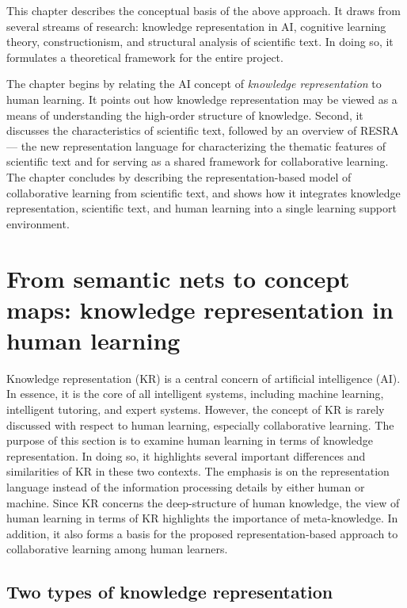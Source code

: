 This chapter describes the conceptual basis of the above approach. It draws
from several streams of research: knowledge representation in AI, cognitive
learning theory, constructionism, and structural analysis of scientific
text. In doing so, it formulates a theoretical framework for the entire
project.

The chapter begins by relating the AI concept of {\it knowledge
representation\/} to human learning. It points out how knowledge
representation may be viewed as a means of understanding the high-order
structure of knowledge. Second, it discusses the characteristics of
scientific text, followed by an overview of RESRA --- the new
representation language for characterizing the thematic features of
scientific text and for serving as a shared framework for collaborative
learning. The chapter concludes by describing the representation-based
model of collaborative learning from scientific text, and shows how it
integrates knowledge representation, scientific text, and human learning
into a single learning support environment.


\section{From semantic nets to concept maps: knowledge representation in
human learning} 

Knowledge representation (KR) is a central concern of artificial
intelligence (AI). In essence, it is the core of all intelligent systems,
including machine learning, intelligent tutoring, and expert
systems. However, the concept of KR is rarely discussed with respect to
human learning, especially collaborative learning. The purpose of this
section is to examine human learning in terms of knowledge
representation. In doing so, it highlights several important differences
and similarities of KR in these two contexts.  The emphasis is on the
representation language instead of the information processing details by
either human or machine. Since KR concerns the deep-structure of human
knowledge, the view of human learning in terms of KR highlights the
importance of meta-knowledge. In addition, it also forms a basis for the
proposed representation-based approach to collaborative learning among
human learners.


\subsection{Two types of knowledge representation}

